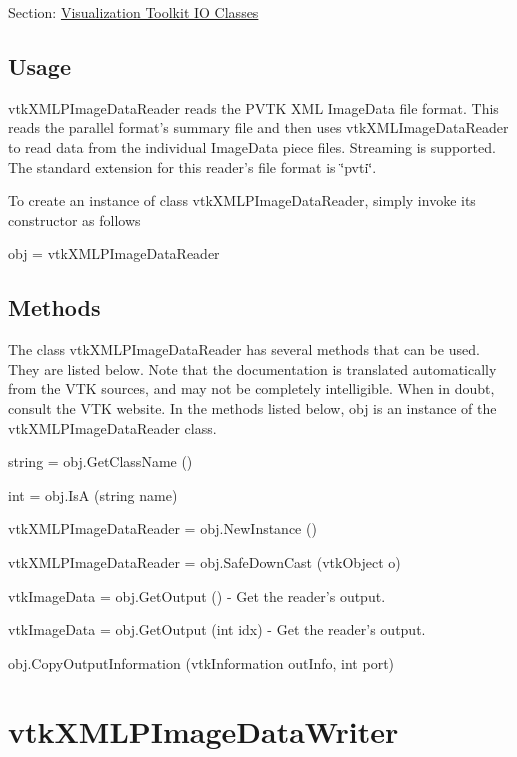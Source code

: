 Section\-: \hyperlink{sec_vtkio}{Visualization Toolkit I\-O Classes} \hypertarget{vtkwidgets_vtkxyplotwidget_Usage}{}\subsection{Usage}\label{vtkwidgets_vtkxyplotwidget_Usage}
vtk\-X\-M\-L\-P\-Image\-Data\-Reader reads the P\-V\-T\-K X\-M\-L Image\-Data file format. This reads the parallel format's summary file and then uses vtk\-X\-M\-L\-Image\-Data\-Reader to read data from the individual Image\-Data piece files. Streaming is supported. The standard extension for this reader's file format is \char`\"{}pvti\char`\"{}.

To create an instance of class vtk\-X\-M\-L\-P\-Image\-Data\-Reader, simply invoke its constructor as follows \begin{DoxyVerb}  obj = vtkXMLPImageDataReader
\end{DoxyVerb}
 \hypertarget{vtkwidgets_vtkxyplotwidget_Methods}{}\subsection{Methods}\label{vtkwidgets_vtkxyplotwidget_Methods}
The class vtk\-X\-M\-L\-P\-Image\-Data\-Reader has several methods that can be used. They are listed below. Note that the documentation is translated automatically from the V\-T\-K sources, and may not be completely intelligible. When in doubt, consult the V\-T\-K website. In the methods listed below, {\ttfamily obj} is an instance of the vtk\-X\-M\-L\-P\-Image\-Data\-Reader class. 
\begin{DoxyItemize}
\item {\ttfamily string = obj.\-Get\-Class\-Name ()}  
\item {\ttfamily int = obj.\-Is\-A (string name)}  
\item {\ttfamily vtk\-X\-M\-L\-P\-Image\-Data\-Reader = obj.\-New\-Instance ()}  
\item {\ttfamily vtk\-X\-M\-L\-P\-Image\-Data\-Reader = obj.\-Safe\-Down\-Cast (vtk\-Object o)}  
\item {\ttfamily vtk\-Image\-Data = obj.\-Get\-Output ()} -\/ Get the reader's output.  
\item {\ttfamily vtk\-Image\-Data = obj.\-Get\-Output (int idx)} -\/ Get the reader's output.  
\item {\ttfamily obj.\-Copy\-Output\-Information (vtk\-Information out\-Info, int port)}  
\end{DoxyItemize}\hypertarget{vtkio_vtkxmlpimagedatawriter}{}\section{vtk\-X\-M\-L\-P\-Image\-Data\-Writer}\label{vtkio_vtkxmlpimagedatawriter}
